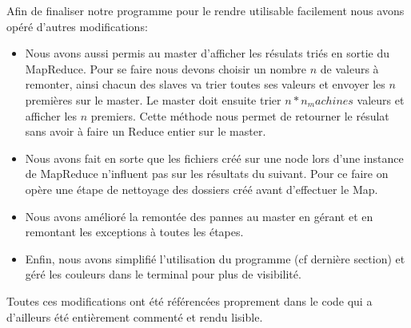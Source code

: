 \documentclass{article}
\begin{document}
Afin de finaliser notre programme pour le rendre utilisable facilement nous avons opéré d'autres modifications:
\begin{itemize}
    \item Nous avons aussi permis au master d'afficher les résulats triés en sortie du MapReduce. Pour se faire nous devons choisir un nombre $n$ de valeurs à remonter, ainsi chacun des slaves va trier toutes ses valeurs et envoyer les $n$ premières sur le master.
    Le master doit ensuite trier $n * n_machines$ valeurs et afficher les $n$ premiers. Cette méthode nous permet de retourner le résulat sans avoir à faire un Reduce entier sur le master.
    \item Nous avons fait en sorte que les fichiers créé sur une node lors d'une instance de MapReduce n'influent pas sur les résultats du suivant. Pour ce faire on opère une étape de nettoyage des dossiers créé avant d'effectuer le Map.
    \item Nous avons amélioré la remontée des pannes au master en gérant et en remontant les exceptions à toutes les étapes.
    \item  Enfin, nous avons simplifié l'utilisation du programme (cf dernière section) et géré les couleurs dans le terminal pour plus de visibilité.
\end{itemize}

Toutes ces modifications ont été référencées proprement dans le code qui a d'ailleurs été entièrement commenté et rendu lisible.
\end{document}
